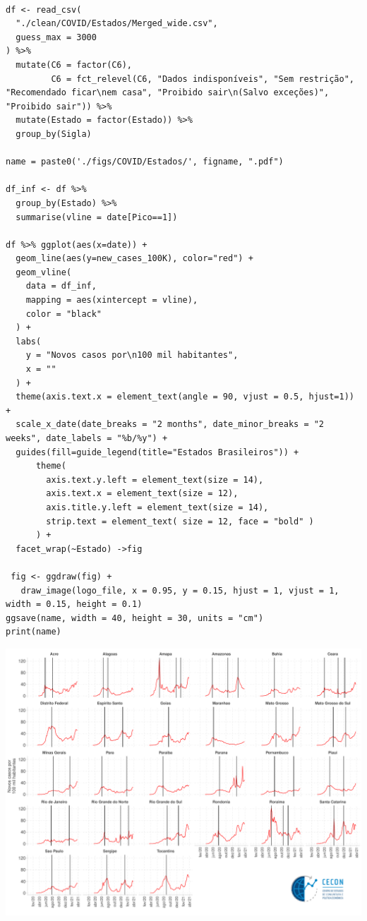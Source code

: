 \documentclass{SelfArx}
\begin{document}
\begin{verbatim}

df <- read_csv(
  "./clean/COVID/Estados/Merged_wide.csv",
  guess_max = 3000
) %>%
  mutate(C6 = factor(C6),
         C6 = fct_relevel(C6, "Dados indisponíveis", "Sem restrição", "Recomendado ficar\nem casa", "Proibido sair\n(Salvo exceções)", "Proibido sair")) %>%
  mutate(Estado = factor(Estado)) %>%
  group_by(Sigla)

name = paste0('./figs/COVID/Estados/', figname, ".pdf")

df_inf <- df %>%
  group_by(Estado) %>%
  summarise(vline = date[Pico==1])

df %>% ggplot(aes(x=date)) +
  geom_line(aes(y=new_cases_100K), color="red") +
  geom_vline(
    data = df_inf,
    mapping = aes(xintercept = vline),
    color = "black"
  ) +
  labs(
    y = "Novos casos por\n100 mil habitantes",
    x = ""
  ) +
  theme(axis.text.x = element_text(angle = 90, vjust = 0.5, hjust=1)) +
  scale_x_date(date_breaks = "2 months", date_minor_breaks = "2 weeks", date_labels = "%b/%y") +
  guides(fill=guide_legend(title="Estados Brasileiros")) +
      theme(
        axis.text.y.left = element_text(size = 14),
        axis.text.x = element_text(size = 12),
        axis.title.y.left = element_text(size = 14),
        strip.text = element_text( size = 12, face = "bold" )
      ) +
  facet_wrap(~Estado) ->fig

 fig <- ggdraw(fig) +
   draw_image(logo_file, x = 0.95, y = 0.15, hjust = 1, vjust = 1, width = 0.15, height = 0.1)
ggsave(name, width = 40, height = 30, units = "cm")
print(name)
\end{verbatim}

\begin{center}
\includegraphics[width=.9\linewidth]{./figs/COVID/Estados/Casos.pdf}
\end{center}
\end{document}
